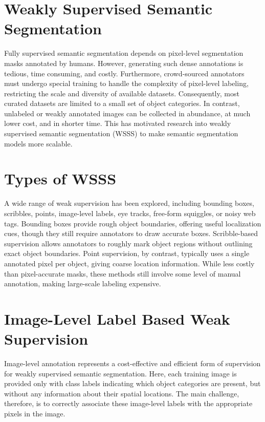 \section{Weakly Supervised Semantic Segmentation}
\label{sec:weakly-supervised}
Fully supervised semantic segmentation depends on pixel-level segmentation masks annotated by humans. However, generating such dense annotations is tedious, time consuming, and costly. Furthermore, crowd-sourced annotators must undergo special training to handle the complexity of pixel-level labeling, restricting the scale and diversity of available datasets. Consequently, most curated datasets are limited to a small set of object categories. In contrast, unlabeled or weakly annotated images can be collected in abundance, at much lower cost, and in shorter time. This has motivated research into weakly supervised semantic segmentation (WSSS) to make semantic segmentation models more scalable.


\section{Types of WSSS}
\label{sec:types-weakly-supervised}
A wide range of weak supervision has been explored, including bounding boxes, scribbles, points, image-level labels,  eye tracks, free-form squiggles, or noisy web tags. Bounding boxes provide rough object boundaries, offering useful localization cues, though they still require annotators to draw accurate boxes.  Scribble-based supervision allows annotators to roughly mark object regions without outlining exact object boundaries. Point supervision, by contrast, typically uses a single annotated pixel per object, giving coarse location information. While less costly than pixel-accurate masks, these methods still involve some level of manual annotation, making large-scale labeling expensive.


\section{Image-Level Label Based Weak Supervision}
\label{sec:image-level-label}
Image-level annotation represents a cost-effective and efficient form of supervision for weakly supervised semantic segmentation. Here, each training image is provided only with class labels indicating which object categories are present, but without any information about their spatial locations. The main challenge, therefore, is to correctly associate these image-level labels with the appropriate pixels in the image.

